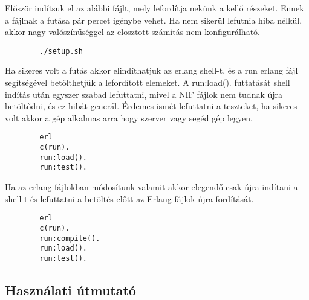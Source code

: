 	Először indítsuk el az alábbi fájlt, mely lefordítja nekünk a kellő részeket. Ennek a fájlnak a futása pár percet igénybe vehet. Ha nem sikerül lefutnia hiba nélkül, akkor nagy valószínűséggel az elosztott számítás nem konfigurálható. 
	\begin{verbatim}
		./setup.sh
	\end{verbatim}
	Ha sikeres volt a futás akkor elindíthatjuk az erlang shell-t, és a run erlang fájl segítségével betölthetjük a lefordított elemeket. A run:load(). futtatását shell indítás után egyszer szabad lefuttatni, mivel a NIF fájlok nem tudnak újra betöltődni, és ez hibát generál.\newline
	Érdemes ismét lefuttatni a teszteket, ha sikeres volt akkor a gép alkalmas arra hogy szerver vagy segéd gép legyen.
	\begin{verbatim}
		erl
		c(run).
		run:load().
		run:test().
	\end{verbatim}
	Ha az erlang fájlokban módosítunk valamit akkor elegendő csak újra indítani a shell-t és lefuttatni a betöltés előtt az Erlang fájlok újra fordítását.
	\begin{verbatim}
		erl
		c(run).
		run:compile().
		run:load().
		run:test().
	\end{verbatim}  
	

\subsection{Használati útmutató}
